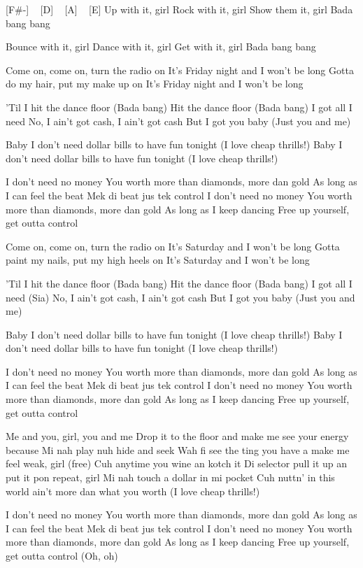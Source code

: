 
[F#-] ~ [D] ~ [A] ~ [E] 
Up with it, girl
Rock with it, girl
Show them it, girl
Bada bang bang

Bounce with it, girl
Dance with it, girl
Get with it, girl
Bada bang bang

Come on, come on, turn the radio on
It's Friday night and I won't be long
Gotta do my hair, put my make up on
It's Friday night and I won't be long

'Til I hit the dance floor (Bada bang)
Hit the dance floor (Bada bang)
I got all I need
No, I ain't got cash, I ain't got cash
But I got you baby
(Just you and me)


Baby I don't need dollar bills to have fun tonight
(I love cheap thrills!)
Baby I don't need dollar bills to have fun tonight
(I love cheap thrills!)

I don't need no money
You worth more than diamonds, more dan gold
As long as I can feel the beat
Mek di beat jus tek control
I don't need no money
You worth more than diamonds, more dan gold
As long as I keep dancing
Free up yourself, get outta control

Come on, come on, turn the radio on
It's Saturday and I won't be long
Gotta paint my nails, put my high heels on
It's Saturday and I won't be long

'Til I hit the dance floor (Bada bang)
Hit the dance floor (Bada bang)
I got all I need (Sia)
No, I ain't got cash, I ain't got cash
But I got you baby
(Just you and me)

Baby I don't need dollar bills to have fun tonight
(I love cheap thrills!)
Baby I don't need dollar bills to have fun tonight
(I love cheap thrills!)

I don't need no money
You worth more than diamonds, more dan gold
As long as I can feel the beat
Mek di beat jus tek control
I don't need no money
You worth more than diamonds, more dan gold
As long as I keep dancing
Free up yourself, get outta control

Me and you, girl, you and me
Drop it to the floor and make me see your energy because
Mi nah play nuh hide and seek
Wah fi see the ting you have a make me feel weak, girl (free)
Cuh anytime you wine an kotch it
Di selector pull it up an put it pon repeat, girl
Mi nah touch a dollar in mi pocket
Cuh nuttn' in this world ain't more dan what you worth (I love cheap thrills!)

I don't need no money
You worth more than diamonds, more dan gold
As long as I can feel the beat
Mek di beat jus tek control
I don't need no money
You worth more than diamonds, more dan gold
As long as I keep dancing
Free up yourself, get outta control (Oh, oh)

